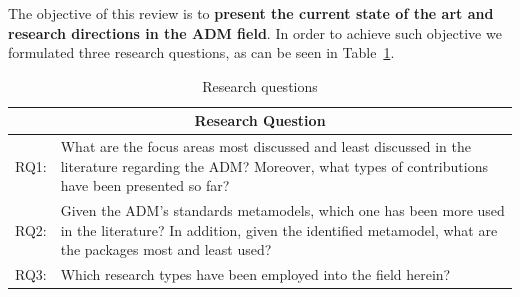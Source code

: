 

The objective of this review is to \textbf{present the current state of the art and research directions in the ADM field}. In order to achieve such objective we formulated three research questions, as can be seen in Table~\ref{tab:research_questions}.

\begin{table}
\centering
\caption{Research questions\label{tab:research_questions}}
\begin{tabular}{p{}p{}}
\hline 
\multicolumn{2}{c}{Research Question}\tabularnewline
\hline 
RQ1: & What are the focus areas most discussed and least discussed in the
literature regarding the ADM? Moreover, what types of contributions
have been presented so far?
\\
RQ2: & Given the ADM's standards metamodels, which one has been more used
in the literature? In addition, given the identified metamodel, what
are the packages most and least used?
\\
RQ3: & Which research types have been employed into the field herein?\tabularnewline
\hline 
\end{tabular}
\end{table}





